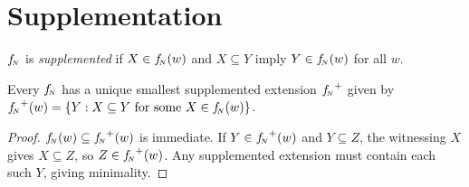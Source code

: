 \section{Supplementation}

\begin{definition}\label{def:supplemented}
  ${f_{\!\scriptscriptstyle N}}$ is \textit{supplemented} if $X \in {f_{\!\scriptscriptstyle N}}(w)$ and
  $X \subseteq Y$ imply $Y \in {f_{\!\scriptscriptstyle N}}(w)$ for all $w$.
\end{definition}

\begin{lemma}\label{lem:supp-closure}
  Every ${f_{\!\scriptscriptstyle N}}$ has a unique smallest supplemented extension
  ${f_{\!\scriptscriptstyle N}}^+$ given by ${f_{\!\scriptscriptstyle N}}^+(w) = \{Y : X \subseteq Y \text{ for
  some } X \in {f_{\!\scriptscriptstyle N}}(w)\}$.
\end{lemma}

\begin{proof}
  ${f_{\!\scriptscriptstyle N}}(w) \subseteq {f_{\!\scriptscriptstyle N}}^+(w)$ is immediate.  If $Y \in
  {f_{\!\scriptscriptstyle N}}^+(w)$ and $Y \subseteq Z$, the witnessing $X$ gives
  $X \subseteq Z$, so $Z \in {f_{\!\scriptscriptstyle N}}^+(w)$.  Any supplemented
  extension must contain each such $Y$, giving minimality.
\end{proof}
